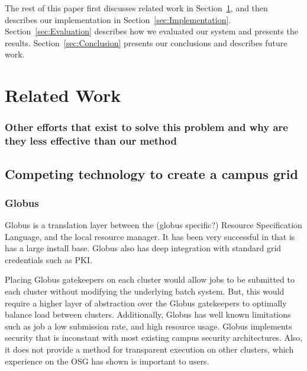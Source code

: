 \documentclass[11pt]{article}
\newcommand{\secref}[1]{Section~\ref{#1}}
\begin{document}





The rest of this paper first discusses related work in
\secref{sec:RelatedWork}, and then describes our implementation in
\secref{sec:Implementation}. \secref{sec:Evaluation} describes how we evaluated
our system and presents the results. \secref{sec:Conclusion} presents our
conclusions and describes future work.


\section{Related Work}
\label{sec:RelatedWork}

\subsubsection*{Other efforts that exist to solve this problem and why are they
less effective than our method}

\subsection{Competing technology to create a campus grid}


\subsubsection{Globus}
Globus is a translation layer between the (globus specific?) Resource Specification Language, and the local resource manager.  It has been very successful in that is has a large install base.  Globus also has deep integration with standard grid credentials such as PKI.

Placing Globus gatekeepers on each cluster would allow jobs to be submitted to each cluster without modifying the underlying batch system.  But, this would require a higher layer of abstraction over the Globus gatekeepers to optimally balance load between clusters.  Additionally, Globus has well known limitations such as job a low submission rate, and high resource usage.  Globus implements security that is inconstant with most existing campus security architectures.  Also, it does not provide a method for transparent execution on other clusters, which experience on the OSG has shown is important to users.
\end{document}
